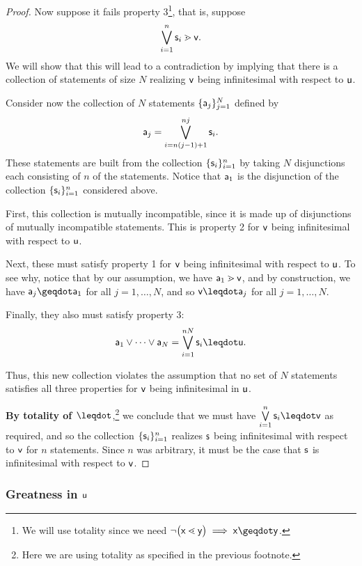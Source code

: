 \documentclass{article}
\begin{document}
\begin{proof}
Now suppose it fails property 3\footnote{We will use totality since we need $\NOT \big(\stmt[x]\sfiner\stmt[y]\big) \implies \stmt[x]\coarser\stmt[y]$.}, that is, suppose 
$$
\bigOR\limits_{i=1}^n \stmt_i \scoarser\stmt[v].
$$
We will show that this will lead to a contradiction by implying that there is a collection of statements of size $N$ realizing $\stmt[v]$ being infinitesimal with respect to $\stmt[u]$. 

Consider now the collection of $N$ statements $\{\stmt[a]_j\}_{j=1}^N$ defined by $$\stmt[a]_j = \bigOR\limits_{i=n(j-1)+1}^{nj}\stmt_i.$$
These statements are built from the collection $\{\stmt_i\}_{i=1}^{n}$ by taking $N$ disjunctions each consisting of $n$ of the statements. Notice that $\stmt[a]_1$ is the disjunction of the collection $\{\stmt_i\}_{i=1}^{n}$ considered above. 

First, this collection is mutually incompatible, since it is made up of disjunctions of mutually incompatible statements. This is property 2 for $\stmt[v]$ being infinitesimal with respect to $\stmt[u]$. 

Next, these must satisfy property 1 for $\stmt[v]$ being infinitesimal with respect to $\stmt[u]$. To see why, notice that by our assumption, we have $\stmt[a]_1\scoarser\stmt[v]$, and by construction, we have $\stmt[a]_j\coarser\stmt[a]_1$ for all $j=1,\ldots,N$, and so $\stmt[v]\finer\stmt[a]_j$ for all $j=1,\ldots,N$. 

Finally, they also must satisfy property 3: $$\stmt[a]_1\OR\cdots\OR\stmt[a]_N = \bigOR\limits_{i=1}^{nN}\stmt_i\finer\stmt[u].$$

Thus, this new collection violates the assumption that no set of $N$ statements satisfies all three properties for $\stmt[v]$ being infinitesimal in $\stmt[u]$. 

{\bf By totality of $\finer$},\footnote{Here we are using totality as specified in the previous footnote.} we conclude that we must have $\bigOR\limits_{i=1}^n \stmt_i \finer\stmt[v]$ as required, and so the collection $\{\stmt_i\}_{i=1}^{n}$ realizes $\stmt$ being infinitesimal with respect to $\stmt[v]$ for $n$ statements. Since $n$ was arbitrary, it must be the case that $\stmt$ is infinitesimal with respect to $\stmt[v]$. 
\end{proof}


\subsubsection{Greatness in $\stmt[u]$}
\end{document}
